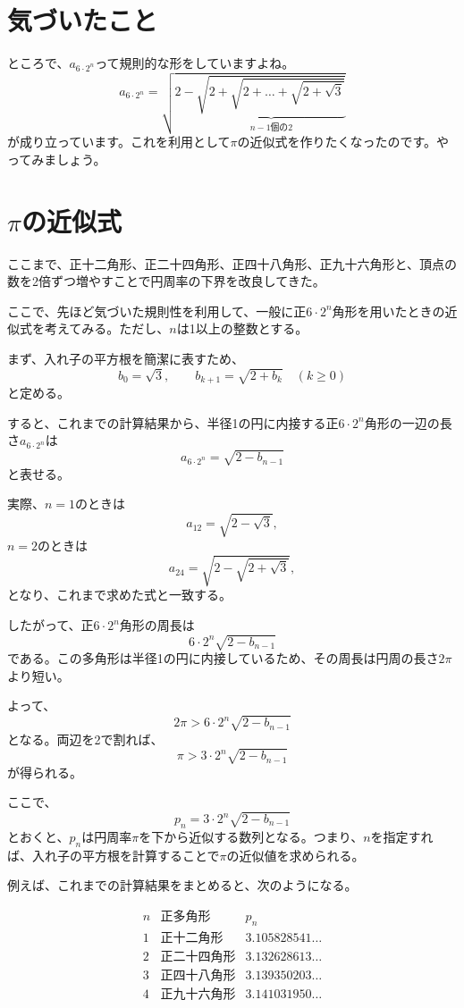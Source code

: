 \documentclass[dvipdfmx]{jlreq}
\begin{document}
\section{気づいたこと}
ところで、$a_{6\cdot2^n}$って規則的な形をしていますよね。
\[
a_{6\cdot2^n}=\sqrt{2-\underbrace{\sqrt{2+\sqrt{2+\dots+\sqrt{2+\sqrt{3}}}}}_{n-1\text{個の}2}}
\]
が成り立っています。これを利用として$\pi$の近似式を作りたくなったのです。やってみましょう。\section{$\pi$の近似式}

ここまで、正十二角形、正二十四角形、正四十八角形、正九十六角形と、頂点の数を2倍ずつ増やすことで円周率の下界を改良してきた。

ここで、先ほど気づいた規則性を利用して、一般に正$6\cdot 2^n$角形を用いたときの近似式を考えてみる。ただし、$n$は1以上の整数とする。

まず、入れ子の平方根を簡潔に表すため、
\[
b_0=\sqrt{3},\qquad
b_{k+1}=\sqrt{2+b_k}\quad(k\geq 0)
\]
と定める。

すると、これまでの計算結果から、半径1の円に内接する正$6\cdot 2^n$角形の一辺の長さ$a_{6\cdot 2^n}$は
\[
a_{6\cdot 2^n}=\sqrt{2-b_{n-1}}
\]
と表せる。

実際、$n=1$のときは
\[
a_{12}=\sqrt{2-\sqrt{3}},
\]
$n=2$のときは
\[
a_{24}=\sqrt{2-\sqrt{2+\sqrt{3}}},
\]
となり、これまで求めた式と一致する。

したがって、正$6\cdot 2^n$角形の周長は
\[
6\cdot 2^n\sqrt{2-b_{n-1}}
\]
である。この多角形は半径1の円に内接しているため、その周長は円周の長さ$2\pi$より短い。

よって、
\[
2\pi>6\cdot 2^n\sqrt{2-b_{n-1}}
\]
となる。両辺を2で割れば、
\[
\boxed{\pi>3\cdot 2^n\sqrt{2-b_{n-1}}}
\]
が得られる。

ここで、
\[
\boxed{p_n=3\cdot 2^n\sqrt{2-b_{n-1}}}
\]
とおくと、$p_n$は円周率$\pi$を下から近似する数列となる。つまり、$n$を指定すれば、入れ子の平方根を計算することで$\pi$の近似値を求められる。

例えば、これまでの計算結果をまとめると、次のようになる。

\[
\begin{array}{c|c|c}
n & \text{正多角形} & p_n\\ \hline
1 & \text{正十二角形} & 3.105828541\ldots\\
2 & \text{正二十四角形} & 3.132628613\ldots\\
3 & \text{正四十八角形} & 3.139350203\ldots\\
4 & \text{正九十六角形} & 3.141031950\ldots
\end{array}
\]
\end{document}
